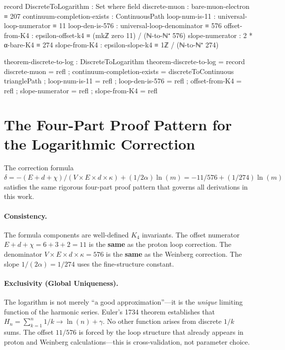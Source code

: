 \documentclass[11pt,a4paper]{book}
\begin{document}
\begin{code}
record DiscreteToLogarithm : Set where
  field
    discrete-muon : bare-muon-electron ≡ 207
    continuum-completion-exists : ContinuousPath
    loop-num-is-11 : universal-loop-numerator ≡ 11
    loop-den-is-576 : universal-loop-denominator ≡ 576
    offset-from-K4 : epsilon-offset-k4 ≡ (mkℤ zero 11) / (ℕ-to-ℕ⁺ 576)
    slope-numerator : 2 * α-bare-K4 ≡ 274
    slope-from-K4 : epsilon-slope-k4 ≡ 1ℤ / (ℕ-to-ℕ⁺ 274)

theorem-discrete-to-log : DiscreteToLogarithm
theorem-discrete-to-log = record
  { discrete-muon = refl
  ; continuum-completion-exists = discreteToContinuous trianglePath
  ; loop-num-is-11 = refl
  ; loop-den-is-576 = refl
  ; offset-from-K4 = refl
  ; slope-numerator = refl
  ; slope-from-K4 = refl
  }
\end{code}

\section{The Four-Part Proof Pattern for the Logarithmic Correction}

The correction formula $\delta = -(E + d + \chi)/(V \times E \times d \times \kappa) + (1/2\alpha)\ln(m) = -11/576 + (1/274)\ln(m)$ satisfies the same rigorous four-part proof pattern that governs all derivations in this work.

\paragraph{Consistency.} The formula components are well-defined $K_4$ invariants. The offset numerator $E + d + \chi = 6 + 3 + 2 = 11$ is the \textbf{same} as the proton loop correction. The denominator $V \times E \times d \times \kappa = 576$ is the \textbf{same} as the Weinberg correction. The slope $1/(2\alpha) = 1/274$ uses the fine-structure constant.

\paragraph{Exclusivity (Global Uniqueness).} The logarithm is not merely ``a good approximation''---it is the \emph{unique} limiting function of the harmonic series. Euler's 1734 theorem establishes that $H_n = \sum_{k=1}^n 1/k \to \ln(n) + \gamma$. No other function arises from discrete $1/k$ sums. The offset $11/576$ is forced by the loop structure that already appears in proton and Weinberg calculations---this is cross-validation, not parameter choice.
\end{document}
